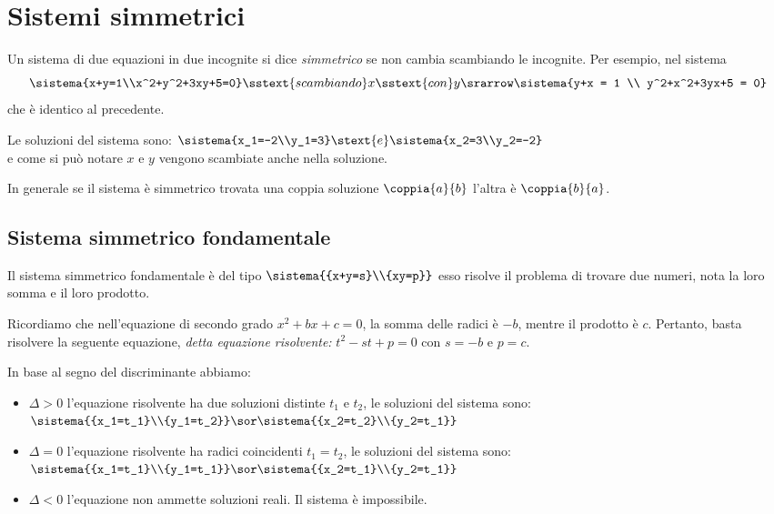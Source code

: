 
\section{Sistemi simmetrici}
\label{sec:sistemi2gr_simmetrici}

Un sistema di due equazioni in due incognite si dice \emph{simmetrico} se 
non cambia scambiando le incognite.
Per esempio, nel sistema 
\[\sistema{x+y=1\\x^2+y^2+3xy+5=0}
\sstext{scambiando} x \sstext{con} y \srarrow 
\sistema{y+x = 1 \\ y^2+x^2+3yx+5 = 0}\] 
che è identico al precedente.

Le soluzioni del sistema sono:  
\(\sistema{x_1=-2\\y_1=3} \stext{ e } \sistema{x_2=3\\y_2=-2}\) \\
e come si può notare \(x\) e \(y\) vengono scambiate anche nella soluzione.

In generale se il sistema è simmetrico trovata una coppia soluzione 
\(\coppia{a}{b}\) 
l'altra è \(\coppia{b}{a}\).

\subsection{Sistema simmetrico fondamentale}
Il sistema simmetrico fondamentale è del tipo 
\(\sistema{{x+y=s}\\{xy=p}}\) esso risolve 
il problema di trovare due numeri, nota la loro somma e il loro prodotto.

Ricordiamo che nell'equazione di secondo grado \(x^2+bx+c=0\), la somma 
delle radici è \(-b\), mentre il prodotto è \(c\). 
Pertanto, basta risolvere la seguente equazione, \emph{detta equazione 
risolvente: } \(t^2-st+p=0\) con \(s=-b\) e \(p=c\).

In base al segno del discriminante abbiamo:
\begin{itemize}[nosep]
\item \(\Delta >0\) l'equazione risolvente ha due soluzioni distinte 
\(t_1\) e \(t_2\), le soluzioni del sistema sono: 
\(\sistema{{x_1=t_1}\\{y_1=t_2}} \sor 
\sistema{{x_2=t_2}\\{y_2=t_1}}\)
\item \(\Delta =0\) l'equazione risolvente ha radici coincidenti 
\(t_1=t_2\), le soluzioni del sistema sono: 
\(\sistema{{x_1=t_1}\\{y_1=t_1}} \sor 
\sistema{{x_2=t_1}\\{y_2=t_1}}\)
\item \(\Delta <0\) l'equazione non ammette soluzioni reali. Il sistema è 
impossibile.
\end{itemize}

